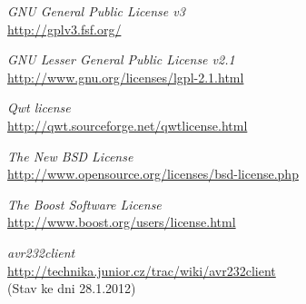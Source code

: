\documentclass[12pt, a4paper, oneside]{article}
\newcommand{\It}{\textit}  %
\begin{document}
\begin{thebibliography}{99}
     \It{GNU General Public License v3} \\
    \url{http://gplv3.fsf.org/}

     \It{GNU Lesser General Public License v2.1} \\
    \url{http://www.gnu.org/licenses/lgpl-2.1.html}

     \It{Qwt license} \\
    \url{http://qwt.sourceforge.net/qwtlicense.html}

     \It{The New BSD License} \\
    \url{http://www.opensource.org/licenses/bsd-license.php}

     \It{The Boost Software License} \\
    \url{http://www.boost.org/users/license.html}

     \It{avr232client} \\
    \url{http://technika.junior.cz/trac/wiki/avr232client}\\
    (Stav ke dni 28.1.2012)

\end{thebibliography}

\newpage
{} %

\listoffigures   %
\end{document}
